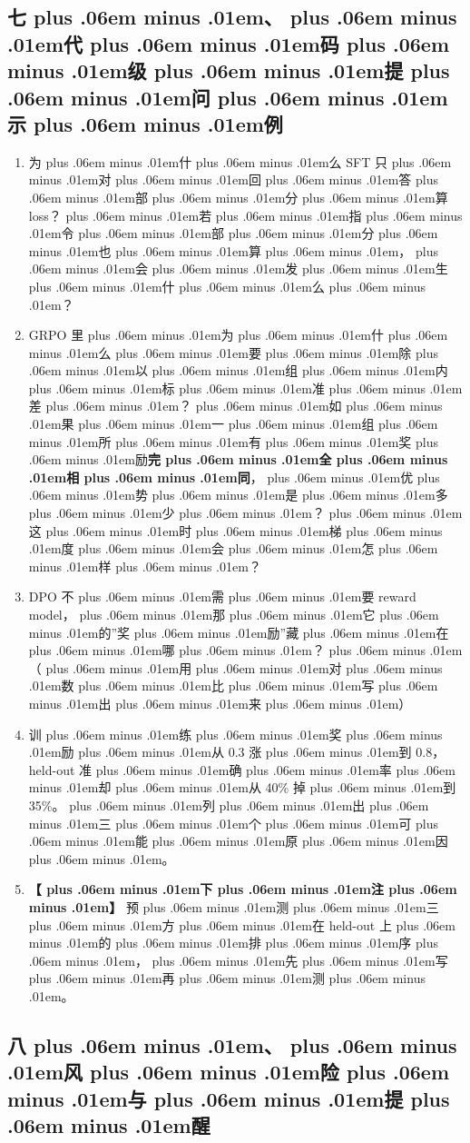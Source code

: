 \documentclass[
]{article}
\providecommand{\tightlist}{%
  \setlength{\itemsep}{0pt}\setlength{\parskip}{0pt}}
\def\zh#1{{\zhfont #1}}
\def\zhglue{\hskip0pt plus .06em minus .01em}
\begin{document}
\subsection{\zh{七\zhglue 、\zhglue 代\zhglue 码\zhglue 级\zhglue 提\zhglue 问\zhglue 示\zhglue 例}}\label{ux4e03ux4ee3ux7801ux7ea7ux63d0ux95eeux793aux4f8b-5}

\begin{enumerate}
\def\labelenumi{\arabic{enumi}.}
\tightlist
\item
  \zh{为\zhglue 什\zhglue 么} SFT \zh{只\zhglue 对\zhglue 回\zhglue 答\zhglue 部\zhglue 分\zhglue 算} loss\zh{？\zhglue 若\zhglue 指\zhglue 令\zhglue 部\zhglue 分\zhglue 也\zhglue 算\zhglue ，\zhglue 会\zhglue 发\zhglue 生\zhglue 什\zhglue 么\zhglue ？}
\item
  GRPO \zh{里\zhglue 为\zhglue 什\zhglue 么\zhglue 要\zhglue 除\zhglue 以\zhglue 组\zhglue 内\zhglue 标\zhglue 准\zhglue 差\zhglue ？\zhglue 如\zhglue 果\zhglue 一\zhglue 组\zhglue 所\zhglue 有\zhglue 奖\zhglue 励}\textbf{\zh{完\zhglue 全\zhglue 相\zhglue 同}}\zh{，\zhglue 优\zhglue 势\zhglue 是\zhglue 多\zhglue 少\zhglue ？\zhglue 这\zhglue 时\zhglue 梯\zhglue 度\zhglue 会\zhglue 怎\zhglue 样\zhglue ？}
\item
  DPO \zh{不\zhglue 需\zhglue 要} reward model\zh{，\zhglue 那\zhglue 它\zhglue 的}''\zh{奖\zhglue 励}''\zh{藏\zhglue 在\zhglue 哪\zhglue ？\zhglue （\zhglue 用\zhglue 对\zhglue 数\zhglue 比\zhglue 写\zhglue 出\zhglue 来\zhglue ）}
\item
  \zh{训\zhglue 练\zhglue 奖\zhglue 励\zhglue 从} 0.3 \zh{涨\zhglue 到} 0.8\zh{，}held-out \zh{准\zhglue 确\zhglue 率\zhglue 却\zhglue 从} 40\% \zh{掉\zhglue 到} 35\%\zh{。\zhglue 列\zhglue 出\zhglue 三\zhglue 个\zhglue 可\zhglue 能\zhglue 原\zhglue 因\zhglue 。}
\item
  \textbf{\zh{【\zhglue 下\zhglue 注\zhglue 】}} \zh{预\zhglue 测\zhglue 三\zhglue 方\zhglue 在} held-out \zh{上\zhglue 的\zhglue 排\zhglue 序\zhglue ，\zhglue 先\zhglue 写\zhglue 再\zhglue 测\zhglue 。}
\end{enumerate}

\subsection{\zh{八\zhglue 、\zhglue 风\zhglue 险\zhglue 与\zhglue 提\zhglue 醒}}\label{ux516bux98ceux9669ux4e0eux63d0ux9192-6}
\end{document}

